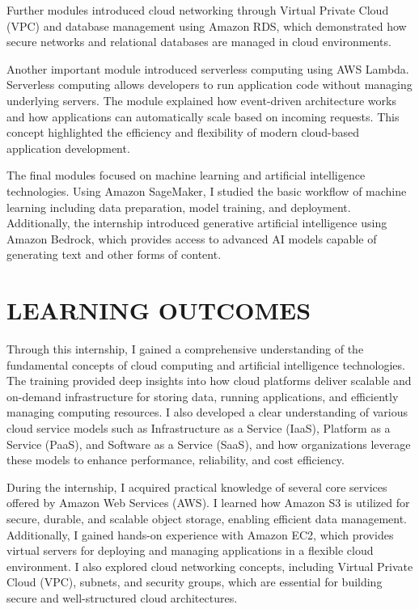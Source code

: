 \documentclass[12pt, a4paper, oneside]{report}
\begin{document}
Further modules introduced cloud networking through Virtual Private Cloud (VPC) 
and database management using Amazon RDS, which demonstrated how secure 
networks and relational databases are managed in cloud environments.

Another important module introduced serverless computing using AWS Lambda. 
Serverless computing allows developers to run application code without managing 
underlying servers. The module explained how event-driven architecture works and how 
applications can automatically scale based on incoming requests. This concept 
highlighted the efficiency and flexibility of modern cloud-based application development.

The final modules focused on machine learning and artificial intelligence technologies. 
Using Amazon SageMaker, I studied the basic workflow of machine learning including 
data preparation, model training, and deployment. Additionally, the internship 
introduced generative artificial intelligence using Amazon Bedrock, which provides 
access to advanced AI models capable of generating text and other forms of content.


\chapter{LEARNING OUTCOMES}

Through this internship, I gained a comprehensive understanding of the fundamental concepts of cloud computing and artificial intelligence technologies. The training provided deep insights into how cloud platforms deliver scalable and on-demand infrastructure for storing data, running applications, and efficiently managing computing resources. I also developed a clear understanding of various cloud service models such as Infrastructure as a Service (IaaS), Platform as a Service (PaaS), and Software as a Service (SaaS), and how organizations leverage these models to enhance performance, reliability, and cost efficiency.

During the internship, I acquired practical knowledge of several core services offered by Amazon Web Services (AWS). I learned how Amazon S3 is utilized for secure, durable, and scalable object storage, enabling efficient data management. Additionally, I gained hands-on experience with Amazon EC2, which provides virtual servers for deploying and managing applications in a flexible cloud environment. I also explored cloud networking concepts, including Virtual Private Cloud (VPC), subnets, and security groups, which are essential for building secure and well-structured cloud architectures.
\end{document}
